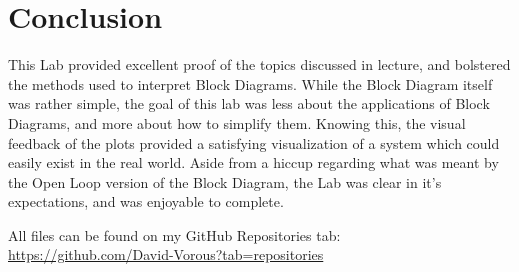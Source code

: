 \documentclass[12pt]{report}
\begin{document}
\section{Conclusion}
This Lab provided excellent proof of the topics discussed in lecture, and bolstered the methods used to interpret Block Diagrams. While the Block Diagram itself was rather simple, the goal of this lab was less about the applications of Block Diagrams, and more about how to simplify them. Knowing this, the visual feedback of the plots provided a satisfying visualization of a system which could easily exist in the real world. Aside from a hiccup regarding what was meant by the Open Loop version of the Block Diagram, the Lab was clear in it's expectations, and was enjoyable to complete.

All files can be found on my GitHub Repositories tab:\\
\url{https://github.com/David-Vorous?tab=repositories}
\end{document}
